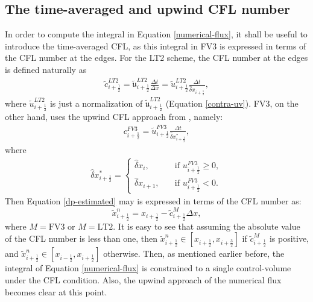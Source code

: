 \documentclass[preprint,12pt]{elsarticle}
\begin{document}
\begin{linenumbers}
\subsection{The time-averaged and upwind CFL number}
\label{timeav-cfl}
In order to compute the integral in Equation \eqref{numerical-flux}, it shall be useful to introduce the time-averaged CFL, as this integral in FV3 is expressed in terms of the CFL number at the edges.
For the LT2 scheme, the CFL number at the edges is defined naturally as
\begin{align}
	\label{cfl_LT2}
	\tilde{c}_{i+\frac{1}{2}}^{LT2} = {\mathfrak{\tilde{u}}}_{i+\frac{1}{2}}^{LT2}\frac{\Delta t}{\Delta x}
	= {\tilde{u}}_{i+\frac{1}{2}}^{LT2}\frac{\Delta t}{\hat{\delta} x_{i+\frac{1}{2}}},
\end{align}
where ${\tilde{u}}_{i+\frac{1}{2}}^{LT2}$ is just a normalization of 
${\mathfrak{\tilde{u}}}_{i+\frac{1}{2}}^{LT2}$ (Equation \eqref{contra-uv}).
 FV3, on the other hand, uses the upwind CFL approach from \cite{lin:1994}, namely:
\begin{align}
	\label{cfl_fv3}
	{c}_{i+\frac{1}{2}}^{FV3}
    ={\tilde{u}}_{i+\frac{1}{2}}^{FV3}\frac{{\Delta t}}
	{{\hat{\delta} x_{i+\frac{1}{2}}^*}},
\end{align}
where
\begin{align}
	\label{cfl_dp1-dx}
	\hat{\delta} x_{i+\frac{1}{2}}^*  =
	\begin{cases}
		{\hat{\delta} x_{i}},
		\quad &\text{if }{{{u}}_{i+\frac{1}{2}}^{FV3} \ge 0},\\
		{\hat{\delta} x_{i+1}}, 
		\quad &\text{if }{{{u}}_{i+\frac{1}{2}}^{FV3} < 0}.
	\end{cases}
\end{align}
Then Equation \eqref{dp-estimated} may is expressed in terms of the CFL number as:
\begin{equation}
	\label{dp-estimated-cfl}
	\tilde{x}_{i+\frac{1}{2}}^n = x_{i+\frac{1}{2}} - {\tilde{c}}^{M}_{i+\frac{1}{2}}\Delta x,
\end{equation}
where $M=\text{FV3}$ or $M=\text{LT2}$. 
It is easy to see that assuming the absolute value of the CFL number is less than one, then $\tilde{x}_{i+\frac{1}{2}}^n \in [{x}_{i+\frac{1}{2}},{x}_{i+\frac{3}{2}}]$ if ${\tilde{c}}^{M}_{i+\frac{1}{2}}$ is positive, and $\tilde{x}_{i+\frac{1}{2}}^n \in [{x}_{i-\frac{1}{2}},{x}_{i+\frac{1}{2}}]$ otherwise.
Then, as mentioned earlier before, the integral of Equation \eqref{numerical-flux} is constrained to a single control-volume under the CFL condition.
Also, the upwind approach of the numerical flux becomes clear at this point.


\end{linenumbers}
\end{document}
